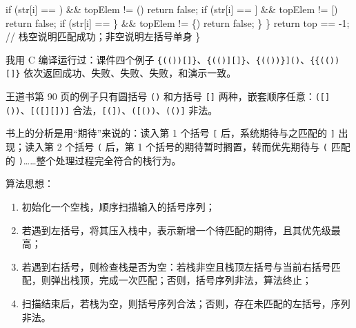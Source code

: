 \documentclass[10.5pt,a4paper,oneside]{article}
\newcommand{\uln}[1]{\CJKunderline[format=\color{wdred},thickness=0.9pt,depth=0.28em]{#1}}
\providecommand{\tightlist}{\setlength{\itemsep}{2pt}\setlength{\parskip}{0pt}}
\newenvironment{Shaded}{}{}
\newcommand{\CharTok}[1]{\textcolor[rgb]{0.63,0.19,0.43}{#1}}
\newcommand{\CommentTok}[1]{\textcolor[rgb]{0.18,0.55,0.23}{#1}}
\newcommand{\ControlFlowTok}[1]{\textcolor[rgb]{0.12,0.31,0.71}{#1}}
\newcommand{\DecValTok}[1]{\textcolor[rgb]{0.77,0.35,0.07}{#1}}
\newcommand{\KeywordTok}[1]{\textcolor[rgb]{0.12,0.31,0.71}{#1}}
\newcommand{\NormalTok}[1]{#1}
\newcommand{\OperatorTok}[1]{\textcolor[rgb]{0.20,0.20,0.20}{#1}}
\begin{document}
\begin{addbox}
\begin{Shaded}
\begin{Highlighting}[]
            \ControlFlowTok{if} \OperatorTok{(}\NormalTok{str}\OperatorTok{[}\NormalTok{i}\OperatorTok{]} \OperatorTok{==} \CharTok{\textquotesingle{})\textquotesingle{}} \OperatorTok{\&\&}\NormalTok{ topElem }\OperatorTok{!=} \CharTok{\textquotesingle{}(\textquotesingle{}}\OperatorTok{)} \ControlFlowTok{return} \KeywordTok{false}\OperatorTok{;}
            \ControlFlowTok{if} \OperatorTok{(}\NormalTok{str}\OperatorTok{[}\NormalTok{i}\OperatorTok{]} \OperatorTok{==} \CharTok{\textquotesingle{}]\textquotesingle{}} \OperatorTok{\&\&}\NormalTok{ topElem }\OperatorTok{!=} \CharTok{\textquotesingle{}[\textquotesingle{}}\OperatorTok{)} \ControlFlowTok{return} \KeywordTok{false}\OperatorTok{;}
            \ControlFlowTok{if} \OperatorTok{(}\NormalTok{str}\OperatorTok{[}\NormalTok{i}\OperatorTok{]} \OperatorTok{==} \CharTok{\textquotesingle{}\}\textquotesingle{}} \OperatorTok{\&\&}\NormalTok{ topElem }\OperatorTok{!=} \CharTok{\textquotesingle{}\{\textquotesingle{}}\OperatorTok{)} \ControlFlowTok{return} \KeywordTok{false}\OperatorTok{;}
        \OperatorTok{\}}
    \OperatorTok{\}}
    \ControlFlowTok{return}\NormalTok{ top }\OperatorTok{==} \OperatorTok{{-}}\DecValTok{1}\OperatorTok{;}               \CommentTok{// 栈空说明匹配成功；非空说明左括号单身}
\OperatorTok{\}}
\end{Highlighting}
\end{Shaded}

我用 C 编译运行过：课件四个例子
\texttt{\{(()){[}{]}\}}、\texttt{\{((){]}{[}{]}\}}、\texttt{\{(())\}{]}()}、\texttt{\{\{(()){[}{]}\}}
依次返回成功、失败、失败、失败，和演示一致。

\end{addbox}

\begin{bookbox}

王道书第 90 页的例子只有圆括号 \texttt{()} 和方括号 \texttt{{[}{]}}
两种，嵌套顺序任意：\texttt{({[}{]}())}、\texttt{{[}({[}{]}{[}{]}){]}}
合法，\texttt{{[}({]})}、\texttt{({[}())}、\texttt{((){]}} 非法。

书上的分析是用“期待”来说的：读入第 1 个括号 \texttt{{[}}
后，系统期待与之匹配的 \texttt{{]}} 出现；读入第 2 个括号 \texttt{(}
后，第 1 个括号的期待暂时搁置，转而优先期待与 \texttt{(} 匹配的
\texttt{)}\ldots\ldots 整个处理过程完全符合\uln{后进先出}的栈行为。

算法思想：

\begin{enumerate}
\def\labelenumi{\arabic{enumi}.}
\tightlist
\item
  初始化一个空栈，顺序扫描输入的括号序列；
\item
  若遇到左括号，将其压入栈中，表示新增一个待匹配的期待，且其优先级最高；
\item
  若遇到右括号，则检查栈是否为空：若栈非空且栈顶左括号与当前右括号匹配，则弹出栈顶，完成一次匹配；否则，括号序列非法，算法终止；
\item
  扫描结束后，若栈为空，则括号序列合法；否则，存在未匹配的左括号，序列非法。
\end{enumerate}

\end{bookbox}
\end{document}
